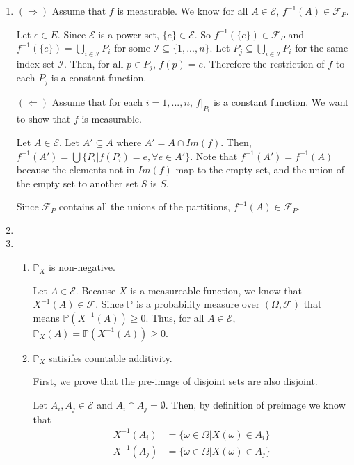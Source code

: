 \documentclass[12pt]{article}
\begin{document}
\begin{enumerate}[start=1,label={\bfseries Problem \arabic*:},leftmargin=1in]
    \item $(\Rightarrow)$ Assume that $f$ is measurable. We know for all $A \in \mathcal{E}$, $f^{-1}(A) \in \mathcal{F}_{P}$.

    Let $e \in E$. Since $\mathcal{E}$ is a power set, $\{e\} \in \mathcal{E}$. 
    So $f^{-1}(\{e\}) \in \mathcal{F}_{P}$ and $f^{-1}(\{e\}) = \bigcup_{i\in \mathcal{I}} P_i$ for some $\mathcal{I} \subseteq \{ 1, ..., n\}$. 
    Let $P_j \subseteq \bigcup_{i\in \mathcal{I}} P_i$ for the same index set $\mathcal{I}$. Then, for all $p \in P_j$, $f(p) = e$. 
    Therefore the restriction of $f$ to each $P_j$ is a constant function. 


    $(\Leftarrow)$ Assume that for each $i = 1, ..., n$, $f|_{P_i}$ is a constant function. We want to show that $f$ is measurable. 
    
    Let $A \in \mathcal{E}$. Let $A' \subseteq A$ where $A' = A \cap Im(f)$. Then, $f^{-1}(A') = \bigcup \{  P_i | f(P_i) = e, \forall e \in A' \}$. 
    Note that $f^{-1}(A') = f^{-1}(A)$ because the elements not in $Im(f)$ map to the empty set, and the union of the empty set to another set $S$ is $S$. 

    Since $\mathcal{F}_P$ contains all the unions of the partitions, $f^{-1}(A) \in \mathcal{F}_P$.


    \item  
    \item \begin{enumerate}
        \item $\mathbb{P}_{X}$ is non-negative.
        
            Let $A \in \mathcal{E}$. Because $X$ is a measureable function, we know that $X^{-1}(A) \in \mathcal{F}$. 
            Since $\mathbb{P}$ is a probability measure over $(\Omega, \mathcal{F})$ that means $\mathbb{P}(X^{-1}(A)) \geq 0$. Thus,
            for all $A \in \mathcal{E}$, $\mathbb{P}_{X}(A) = \mathbb{P}(X^{-1}(A)) \geq 0$.
        \item $\mathbb{P}_{X}$ satisifes countable additivity. 
        
        First, we prove that the pre-image of disjoint sets are also disjoint. 

        Let $A_{i}, A_{j} \in \mathcal{E}$ and $A_{i} \cap A_{j} = \emptyset$. Then,
        by definition of preimage we know that 
        \begin{align*}
            X^{-1}(A_i) &= \{ \omega \in \Omega | X(\omega) \in A_{i}\}\\
            X^{-1}(A_j) &= \{ \omega \in \Omega | X(\omega) \in A_{j}\}
        \end{align*}
        

\end{enumerate}
\end{enumerate}
\end{document}
